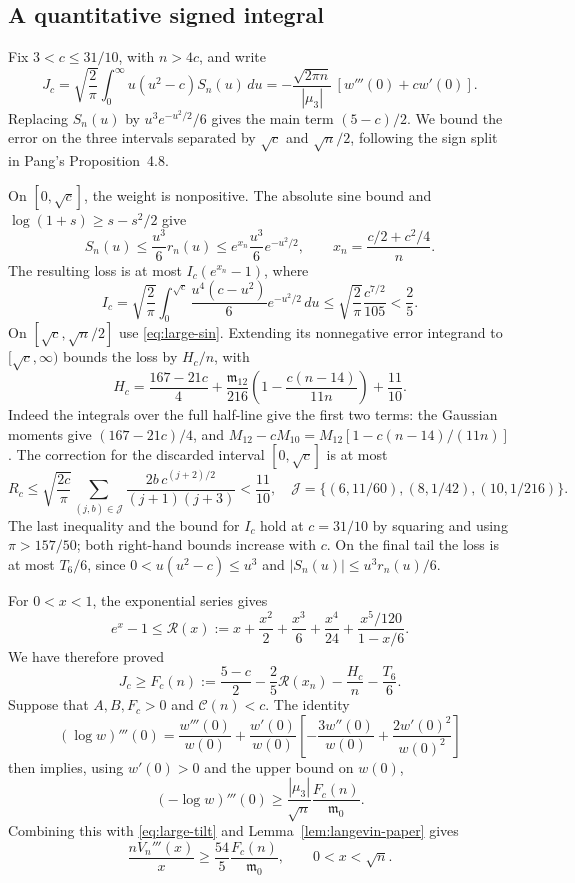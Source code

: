 \documentclass[11pt,a4paper]{article}
\theoremstyle{remark}\newtheorem{remark}[theorem]{Remark}
\begin{document}
\subsection{A quantitative signed integral}
Fix $3<c\le31/10$, with $n>4c$, and write
\[
 J_c=\sqrt{\frac2\pi}\int_0^\infty u(u^2-c)S_n(u)\,du
 =-\frac{\sqrt{2\pi n}}{|\mu_3|}\,[w'''(0)+cw'(0)].
\]
Replacing $S_n(u)$ by $u^3e^{-u^2/2}/6$ gives the main term $(5-c)/2$.
We bound the error on the three intervals separated by $\sqrt c$ and
$\sqrt n/2$, following the sign split in Pang's Proposition~4.8.

On $[0,\sqrt c]$, the weight is nonpositive. The absolute sine bound and
$\log(1+s)\ge s-s^2/2$ give
\[
 S_n(u)\le\frac{u^3}{6}r_n(u)
 \le e^{x_n}\frac{u^3}{6}e^{-u^2/2},
 \qquad x_n=\frac{c/2+c^2/4}{n}.
\]
The resulting loss is at most $I_c(e^{x_n}-1)$, where
\[
 I_c=\sqrt{\frac2\pi}\int_0^{\sqrt c}
          \frac{u^4(c-u^2)}6e^{-u^2/2}\,du
 \le\sqrt{\frac2\pi}\frac{c^{7/2}}{105}<\frac25.
\]
On $[\sqrt c,\sqrt n/2]$ use \eqref{eq:large-sin}. Extending its
nonnegative error integrand to $[\sqrt c,\infty)$ bounds the loss by
$H_c/n$, with
\[
 H_c=\frac{167-21c}{4}
 +\frac{\mathfrak m_{12}}{216}\left(1-\frac{c(n-14)}{11n}\right)
 +\frac{11}{10}.
\]
Indeed the integrals over the full half-line give the first two terms:
the Gaussian moments give $(167-21c)/4$, and
$M_{12}-cM_{10}=M_{12}[1-c(n-14)/(11n)]$.
The correction for the discarded interval $[0,\sqrt c]$ is at most
\[
 R_c\le\sqrt{\frac{2c}\pi}
 \sum_{(j,b)\in\mathcal J}
 \frac{2b\,c^{(j+2)/2}}{(j+1)(j+3)}<\frac{11}{10},
 \quad\mathcal J=\{(6,11/60),(8,1/42),(10,1/216)\}.
\]
The last inequality and the bound for $I_c$ hold at $c=31/10$ by squaring
and using $\pi>157/50$; both right-hand bounds increase with $c$.
On the final tail the loss is at most $T_6/6$, since
$0<u(u^2-c)\le u^3$ and $|S_n(u)|\le u^3r_n(u)/6$.

For $0<x<1$, the exponential series gives
\[
 e^x-1\le\mathcal R(x):=x+\frac{x^2}{2}+\frac{x^3}{6}+\frac{x^4}{24}
                  +\frac{x^5/120}{1-x/6}.
\]
We have therefore proved
\[
 J_c\ge F_c(n):=\frac{5-c}{2}-\frac25\mathcal R(x_n)
                          -\frac{H_c}{n}-\frac{T_6}{6}.
\]
Suppose that $A,B,F_c>0$ and $\mathcal C(n)<c$. The identity
\[
 (\log w)'''(0)=\frac{w'''(0)}{w(0)}+
 \frac{w'(0)}{w(0)}
 \left[-\frac{3w''(0)}{w(0)}+\frac{2w'(0)^2}{w(0)^2}\right]
\]
then implies, using $w'(0)>0$ and the upper bound on $w(0)$,
\[
 (-\log w)'''(0)\ge\frac{|\mu_3|}{\sqrt n}
                          \frac{F_c(n)}{\mathfrak m_0}.
\]
Combining this with \eqref{eq:large-tilt} and
Lemma~\ref{lem:langevin-paper} gives
\begin{equation}\label{eq:large-final}
 \frac{nV_n'''(x)}x\ge\frac{54}{5}\frac{F_c(n)}{\mathfrak m_0},
 \qquad 0<x<\sqrt n.
\end{equation}
\end{document}
